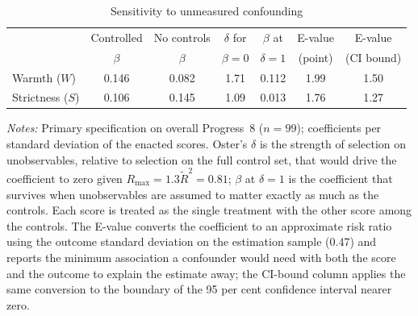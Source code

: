 \begin{table}[htbp]\centering
\caption{Sensitivity to unmeasured confounding}
\label{tab:sensitivity_bounds}
\small
\begin{tabular}{lcccccc}
\toprule
 & Controlled & No controls & $\delta$ for & $\beta$ at & E-value & E-value \\
 & $\beta$ & $\beta$ & $\beta = 0$ & $\delta = 1$ & (point) & (CI bound) \\
\midrule
Warmth ($W$) & 0.146 & 0.082 & 1.71 & 0.112 & 1.99 & 1.50 \\
Strictness ($S$) & 0.106 & 0.145 & 1.09 & 0.013 & 1.76 & 1.27 \\
\bottomrule
\end{tabular}
\begin{minipage}{\linewidth}
\smallskip
\footnotesize\textit{Notes:} Primary specification on overall Progress~8
($n = 99$); coefficients per standard deviation of the enacted
scores. Oster's $\delta$ \citep[via \texttt{psacalc}]{oster2019} is the strength of
selection on unobservables, relative to selection on the full control set, that
would drive the coefficient to zero given $R_{\max} = 1.3 \tilde{R}^2 =
0.81$; $\beta$ at $\delta = 1$ is the coefficient that survives when
unobservables are assumed to matter exactly as much as the controls. Each score
is treated as the single treatment with the other score among the controls. The
E-value converts the coefficient to an approximate risk ratio using the outcome
standard deviation on the estimation sample (0.47) and reports the minimum
association a confounder would need with both the score and the outcome to
explain the estimate away; the CI-bound column applies the same conversion to
the boundary of the 95 per cent confidence interval nearer zero.
\end{minipage}
\end{table}
